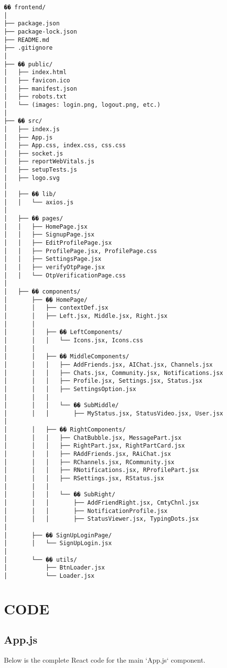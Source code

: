 \documentclass[12pt,a4paper]{report}
\begin{document}
\begin{verbatim}
�� frontend/
│
├── package.json
├── package-lock.json
├── README.md
├── .gitignore
│
├── �� public/
│   ├── index.html
│   ├── favicon.ico
│   ├── manifest.json
│   ├── robots.txt
│   └── (images: login.png, logout.png, etc.)
│
├── �� src/
│   ├── index.js
│   ├── App.js
│   ├── App.css, index.css, css.css
│   ├── socket.js
│   ├── reportWebVitals.js
│   ├── setupTests.js
│   ├── logo.svg
│
│   ├── �� lib/
│   │   └── axios.js
│
│   ├── �� pages/
│   │   ├── HomePage.jsx
│   │   ├── SignupPage.jsx
│   │   ├── EditProfilePage.jsx
│   │   ├── ProfilePage.jsx, ProfilePage.css
│   │   ├── SettingsPage.jsx
│   │   ├── verifyOtpPage.jsx
│   │   └── OtpVerificationPage.css
│
│   ├── �� components/
│       ├── �� HomePage/
│       │   ├── contextDef.jsx
│       │   ├── Left.jsx, Middle.jsx, Right.jsx
│       │
│       │   ├── �� LeftComponents/
│       │   │   └── Icons.jsx, Icons.css
│       │
│       │   ├── �� MiddleComponents/
│       │   │   ├── AddFriends.jsx, AIChat.jsx, Channels.jsx
│       │   │   ├── Chats.jsx, Community.jsx, Notifications.jsx
│       │   │   ├── Profile.jsx, Settings.jsx, Status.jsx
│       │   │   ├── SettingsOption.jsx
│       │   │
│       │   │   └── �� SubMiddle/
│       │   │       ├── MyStatus.jsx, StatusVideo.jsx, User.jsx
│
│       │   ├── �� RightComponents/
│       │   │   ├── ChatBubble.jsx, MessagePart.jsx
│       │   │   ├── RightPart.jsx, RightPartCard.jsx
│       │   │   ├── RAddFriends.jsx, RAiChat.jsx
│       │   │   ├── RChannels.jsx, RCommunity.jsx
│       │   │   ├── RNotifications.jsx, RProfilePart.jsx
│       │   │   ├── RSettings.jsx, RStatus.jsx
│       │   │
│       │   │   └── �� SubRight/
│       │   │       ├── AddFriendRight.jsx, CmtyChnl.jsx
│       │   │       ├── NotificationProfile.jsx
│       │   │       ├── StatusViewer.jsx, TypingDots.jsx
│
│       ├── �� SignUpLoginPage/
│       │   └── SignUpLogin.jsx
│
│       └── �� utils/
│           ├── BtnLoader.jsx
│           └── Loader.jsx
\end{verbatim}

\newpage


\chapter{CODE}
\section{App.js}
Below is the complete React code for the main `App.js` component.
\end{document}
